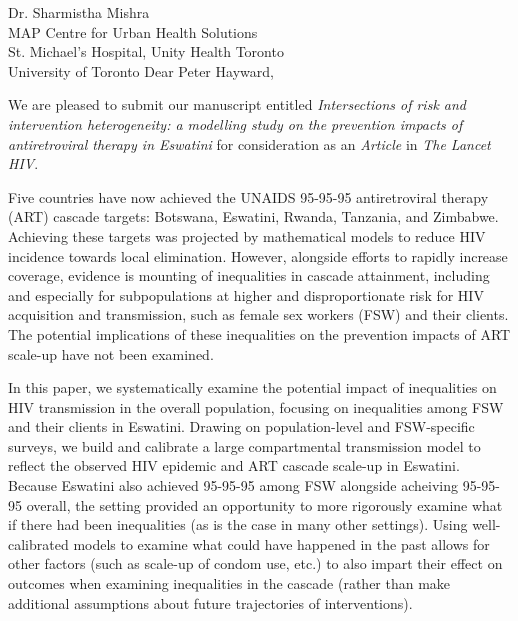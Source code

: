 \address{
  Peter Hayward\\
  Editor-in-Chief\\
  The Lancet HIV
}{Dr. Sharmistha Mishra\\
  MAP Centre for Urban Health Solutions\\
  St. Michael's Hospital, Unity Health Toronto\\
  University of Toronto}
Dear Peter Hayward,
\par
We are pleased to submit our manuscript entitled
\emph{Intersections of risk and intervention heterogeneity:
  a modelling study on the prevention impacts of antiretroviral therapy in Eswatini}
for consideration as an \emph{Article} in \emph{The Lancet HIV}.
\par %
Five countries have now achieved
the UNAIDS 95-95-95 antiretroviral therapy (ART) cascade targets:
Botswana, Eswatini, Rwanda, Tanzania, and Zimbabwe.
Achieving these targets was projected by
mathematical models to reduce HIV incidence towards local elimination.
However, alongside efforts to rapidly increase coverage,
evidence is mounting of inequalities in cascade attainment,
including and especially for subpopulations
at higher and disproportionate risk for HIV acquisition and transmission, such as female sex workers (FSW) and their clients. 
The potential implications of these inequalities on
the prevention impacts of ART scale-up have not been examined.
\par
In this paper, we systematically examine the potential impact of inequalities on HIV transmission in the overall population,
focusing on inequalities among FSW and their clients in Eswatini. 
Drawing on population-level and FSW-specific surveys,
we build and calibrate a large compartmental transmission model
to reflect the observed HIV epidemic and ART cascade scale-up in Eswatini.
Because Eswatini also achieved 95-95-95 among FSW alongside acheiving 
95-95-95 overall, the setting provided an opportunity to more rigorously examine what if 
there had been inequalities (as is the case in many other settings). 
Using well-calibrated models to examine what could have happened in the past 
allows for other factors (such as scale-up of condom use, etc.) to also impart their effect on outcomes
when examining inequalities in the cascade (rather than make additional assumptions about future trajectories of interventions). %
